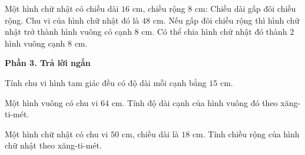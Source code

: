 \begin{ex} %
Một hình chữ nhật có chiều dài $16\text{ cm}$, chiều rộng $8\text{ cm}$:
\choiceTF
{\True Chiều dài gấp đôi chiều rộng.}
{\True Chu vi của hình chữ nhật đó là $48\text{ cm}$.}
{Nếu gấp đôi chiều rộng thì hình chữ nhật trở thành hình vuông có cạnh $8\text{ cm}$.}
{\True Có thể chia hình chữ nhật đó thành 2 hình vuông cạnh $8\text{ cm}$.}
\end{ex}

\textbf{Phần 3. Trả lời ngắn}

\begin{ex} %
Tính chu vi hình tam giác đều có độ dài mỗi cạnh bằng $15\text{ cm}$.
\end{ex}

\begin{ex} %
Một hình vuông có chu vi $64\text{ cm}$. Tính độ dài cạnh của hình vuông đó theo xăng-ti-mét.
\end{ex}

\begin{ex} %
Một hình chữ nhật có chu vi $50\text{ cm}$, chiều dài là $18\text{ cm}$. Tính chiều rộng của hình chữ nhật theo xăng-ti-mét.
\end{ex}

